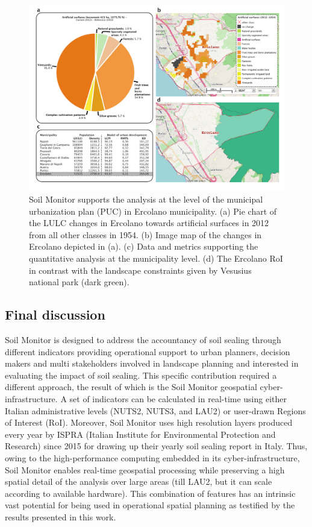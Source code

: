 \documentclass[APA,LATO1COL,doublespace]{WileyNJD-v2}
\begin{document}
\begin{figure}[t] %
    \centerline{\includegraphics[width=450pt]{07_caso_comunale.pdf}}
    \caption{ Soil Monitor supports the analysis at the level of the municipal urbanization plan (PUC) in Ercolano municipality.
              (a) Pie chart of the LULC changes in Ercolano towards artificial surfaces in 2012 from all other classes in 1954.
              (b) Image map of the changes in Ercolano depicted in (a).
              (c) Data and metrics supporting the quantitative analysis at the municipality level.
              (d) The Ercolano RoI in contrast with the landscape constraints given by Vesusius national park (dark green). }
    \label{fig:caseCOM_Ercolano}
\end{figure}

\subsection{Final discussion}
Soil Monitor is designed to address the accountancy of soil sealing through different indicators providing operational support to urban planners, decision makers and multi stakeholders involved in landscape planning and interested in evaluating the impact of soil sealing. 
This specific contribution required a different approach, the result of which is the Soil Monitor geospatial cyber-infrastructure. 
A set of indicators can be calculated in real-time using either Italian administrative levels (NUTS2, NUTS3, and LAU2) or user-drawn Regions of Interest (RoI). 
Moreover, Soil Monitor uses high resolution layers produced every year by ISPRA (Italian Institute for Environmental Protection and Research) since 2015 for drawing up their yearly soil sealing report in Italy. 
Thus, owing to the high-performance computing embedded in its cyber-infrastructure, Soil Monitor enables real-time geospatial processing while preserving a high spatial detail of the analysis over large areas (till LAU2, but it can scale according to available hardware).
This combination of features has an intrinsic vast potential for being used in operational spatial planning as testified by the results presented in this work. 
\end{document}
